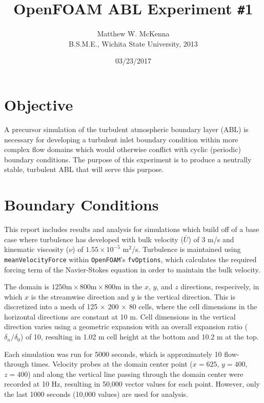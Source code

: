 \documentclass[12pt]{article}
\title{%
	OpenFOAM ABL Experiment \texttt{\#}1\\
}
\date{%
	03/23/2017
}
\author{%
	Matthew W. McKenna\\
	B.S.M.E., Wichita State University, 2013
}
\begin{document}
\maketitle
\thispagestyle{empty}
\pagebreak
\section{Objective}
A precursor simulation of the turbulent atmospheric boundary layer (ABL) is necessary for developing a turbulent inlet boundary condition within more complex flow domains which would otherwise conflict with cyclic (periodic) boundary conditions.  The purpose of this experiment is to produce a neutrally stable, turbulent ABL that will serve this purpose.

\section{Boundary Conditions}
This report includes results and analysis for simulations which build off of a base case where turbulence has developed with bulk velocity ($\bar{U}$) of 3 m/s and kinematic viscosity ($\nu$) of $1.55 \times 10^{-5}$ m$^2$/s.  Turbulence is maintained using \texttt{meanVelocityForce} within \texttt{OpenFOAM}'s \texttt{fvOptions}, which calculates the required forcing term of the Navier-Stokes equation in order to maintain the bulk velocity.

The domain is $1250 \text{m} \times 800 \text{m} \times 800 \text{m}$ in the $x$, $y$, and $z$ directions, respecively, in which $x$ is the streamwise direction and $y$ is the vertical direction.  This is discretized into a mesh of 125 $\times$ 200 $\times$ 80 cells, where the cell dimensions in the horizontal directions are constant at 10 m.  Cell dimensions in the vertical direction varies using a geometric expansion with an overall expansion ratio ($\delta_n/\delta_0$) of 10, resulting in 1.02 m cell height at the bottom and 10.2 m at the top.

Each simulation was run for 5000 seconds, which is approximately 10 flow-through times.  Velocity probes at the domain center point ($x=625$, $y=400$, $z=400$) and along the vertical line passing through the domain center were recorded at 10 Hz, resulting in 50,000 vector values for each point.  However, only the last 1000 seconds (10,000 values) are used for analysis.
\end{document}
